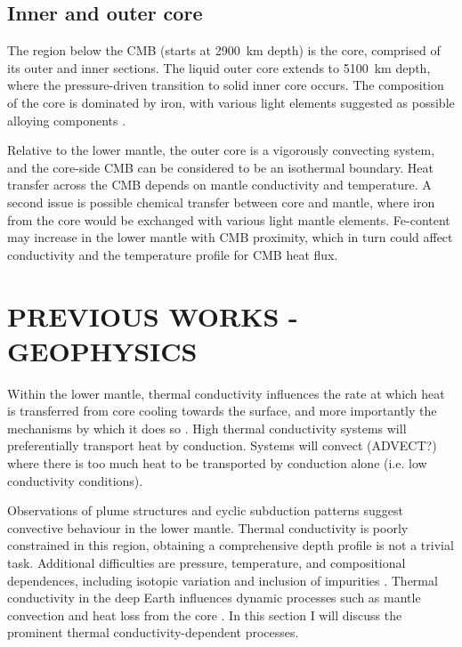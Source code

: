 \subsection{Inner and outer core}

The region below the CMB (starts at 2900~km depth) is the core, comprised of its outer and inner sections. The liquid outer core extends to 5100~km depth, where the pressure-driven transition to solid inner core occurs. The composition of the core is dominated by iron, with various light elements suggested as possible alloying components \citep[e.g.][]{Allegre1995, Alfe2007}.

Relative to the lower mantle, the outer core is a vigorously convecting system, and the core-side CMB can be considered to be an isothermal boundary. Heat transfer across the CMB depends on mantle conductivity and temperature. A second issue is possible chemical transfer between core and mantle, where iron from the core would be exchanged with various light mantle elements. Fe-content may increase in the lower mantle with CMB proximity, which in turn could affect conductivity and the temperature profile for CMB heat flux.








\section{PREVIOUS WORKS - GEOPHYSICS}
\label{sec:ch1:cond_in_earth}

Within the lower mantle, thermal conductivity influences the rate at which heat is transferred from core cooling towards the surface, and more importantly the mechanisms by which it does so \citep{Lay2008}. High thermal conductivity systems will preferentially transport heat by conduction. Systems will convect (ADVECT?) where there is too much heat to be transported by conduction alone (i.e. low conductivity conditions).

Observations of plume structures and cyclic subduction patterns \citep[see][]{Garnero2008} suggest convective behaviour in the lower mantle. Thermal conductivity is poorly constrained in this region, obtaining a comprehensive depth profile is not a trivial task. Additional difficulties are pressure, temperature, and compositional dependences, including isotopic variation \citep{Tang2010,Dalton2013,Tang2014} and inclusion of impurities \citep{Manthilake2011,Ammann2014,Ohta2014}. Thermal conductivity in the deep Earth influences dynamic processes such as mantle convection and heat loss from the core \citep{Lay2008}. In this section I will discuss the prominent thermal conductivity-dependent processes.


